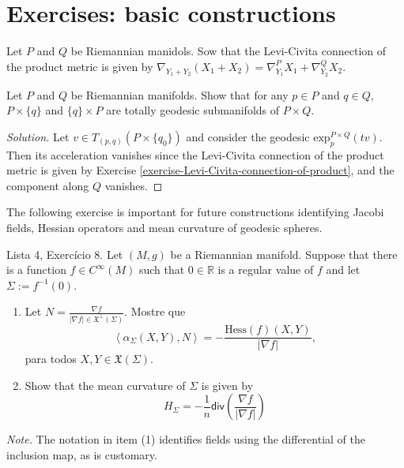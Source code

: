 \section{Exercises: basic constructions}
\label{section-exercises-constructions}

\begin{exercise}
\label{exercise-Levi-Civita-connection-of-product}
Let $P$ and $Q$ be Riemannian manidols. Sow that the Levi-Civita connection of
the product metric is given by
$\nabla_{Y_1+Y_2}(X_1+X_2)=\nabla^P_{Y_1}X_1+\nabla^Q_{Y_2}X_2$.
\end{exercise}

\begin{exercise}
\label{exercise-totally-geodesic-submanifolds-of-product}
Let $P$ and $Q$ be Riemannian manifolds. Show that for any $p \in P$ and $q \in
Q$, $P\times \{q\}$ and $\{q\}\times P$ are totally geodesic
submanifolds of $P \times Q$.
\end{exercise}

\begin{proof}[Solution]
Let $v \in T_{(p,q)}(P\times\{q_0\})$ and consider the geodesic
 $\text{exp}_p^{P\times Q}(tv)$. Then
its acceleration vanishes since the Levi-Civita connection of the product metric
is given by Exercise \ref{exercise-Levi-Civita-connection-of-product}, and the
component along $Q$ vanishes.
\end{proof}

The following exercise is important for future constructions identifying Jacobi
fields, Hessian operators and mean curvature of geodesic spheres.

\begin{exercise}
\label{exercise-mean-curvature}
Lista 4, Exercício 8. Let $(M,g)$ be a Riemannian manifold. Suppose that there
is a function $f \in C^\infty(M)$ such that $0 \in \mathbb{R}$ is a regular
value of $f$ and let $\Sigma:=f^{-1}(0)$.
\begin{enumerate}
\item Let $N=\frac{\nabla f}{|\nabla f| \in \mathfrak{X}^\perp(\Sigma)}$. Mostre
que
$$
\left<\alpha_{\Sigma}(X,Y),N\right>=-\frac{\text{Hess}(f)(X,Y)}{|\nabla f|},
$$
para todos $X,Y \in \mathfrak{X}(\Sigma)$.

\item Show that the mean curvature of $\Sigma$ is given by
$$
H_{\Sigma}=-\frac{1}{n}\mathsf{div}\left(\frac{\nabla f}{|\nabla f|}\right)
$$
\end{enumerate}
{\it Note.} The notation in item (1) identifies fields using the differential of
the inclusion map, as is customary.
\end{exercise}

